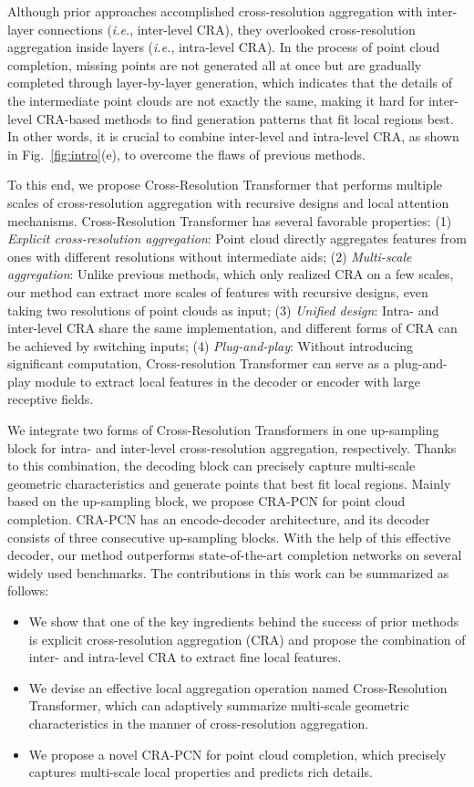 \documentclass[letterpaper]{article} %
\begin{document}
Although prior approaches accomplished cross-resolution aggregation with inter-layer connections ({\em i.e.}, inter-level CRA), they overlooked cross-resolution aggregation inside layers ({\em i.e.}, intra-level CRA).
In the process of point cloud completion, missing points are not generated all at once but are gradually completed through layer-by-layer generation, which indicates that the details of the intermediate point clouds are not exactly the same, making it hard for inter-level CRA-based methods to find generation patterns that fit local regions best.
In other words, it is crucial to combine inter-level and intra-level CRA, as shown in Fig.~\ref{fig:intro}(e), to overcome the flaws of previous methods.

To this end, we propose Cross-Resolution Transformer that performs multiple scales of cross-resolution aggregation with recursive designs and local attention mechanisms.
Cross-Resolution Transformer has several favorable properties:
(1) {\em Explicit cross-resolution aggregation}: Point cloud directly aggregates features from ones with different resolutions without intermediate aids;
(2) {\em Multi-scale aggregation}: Unlike previous methods, which only realized CRA  on a few scales, our method can extract more scales of features with recursive designs, even taking two resolutions of point clouds as input;
(3) {\em Unified design}: Intra- and inter-level CRA  share the same implementation, and different forms of CRA can be achieved by switching inputs;
(4) {\em Plug-and-play}: Without introducing significant computation, Cross-resolution Transformer can serve as a plug-and-play module to extract local features in the decoder or encoder with large receptive fields.

We integrate  two  forms of Cross-Resolution Transformers  in one up-sampling block  for intra- and inter-level cross-resolution aggregation, respectively.
Thanks to this combination, the decoding block can precisely capture multi-scale geometric characteristics and generate points that best fit local regions.
Mainly based on the up-sampling block, we propose CRA-PCN for point cloud completion.
CRA-PCN has an encode-decoder architecture, and its decoder consists of three consecutive up-sampling blocks.
With the help of this effective decoder, our method outperforms state-of-the-art completion networks on several widely used benchmarks.
The contributions in this work can be summarized as follows:

\begin{itemize}
\item We show that one of the key ingredients behind the success of prior methods is explicit cross-resolution aggregation (CRA) and propose the combination of inter- and intra-level CRA to extract fine local features.
\item We devise an effective local aggregation operation named Cross-Resolution Transformer, which can adaptively summarize multi-scale  geometric characteristics in the manner of cross-resolution aggregation.
\item We propose a novel CRA-PCN for point cloud completion, which precisely captures multi-scale local properties  and predicts  rich details.
\end{itemize}
\end{document}
